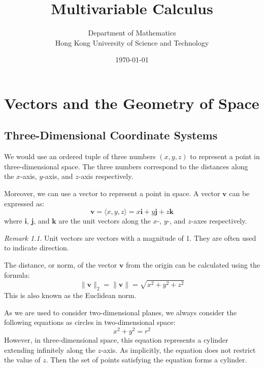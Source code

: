 \documentclass{book}
\theoremstyle{remark}
\newtheorem*{remark}{Remark}
\begin{document}
\frontmatter
\title{\sffamily\Huge\color{ocre} Multivariable Calculus}
\author{\sffamily Department of Mathematics\\\sffamily Hong Kong University of Science and Technology}
\date{\sffamily \today}
\maketitle

\tableofcontents

\mainmatter

\chapter{Vectors and the Geometry of Space}

\section{Three-Dimensional Coordinate Systems}

We would use an ordered tuple of three numbers $(x, y, z)$ to represent a point in three-dimensional space. The three numbers correspond to the distances along the $x$-axis, $y$-axis, and $z$-axis respectively.

Moreover, we can use a vector to represent a point in space. A vector $\mathbf{v}$ can be expressed as:
\[
    \mathbf{v} = \langle x, y, z \rangle = x\mathbf{i} + y\mathbf{j} + z\mathbf{k}
\]
where $\mathbf{i}$, $\mathbf{j}$, and $\mathbf{k}$ are the unit vectors along the $x$-, $y$-, and $z$-axes respectively.

\begin{remark}
    Unit vectors are vectors with a magnitude of 1. They are often used to indicate direction.
\end{remark}

The distance, or norm, of the vector $\mathbf{v}$ from the origin can be calculated using the formula:
\[
    \|\mathbf{v}\|_2 = \|\mathbf{v}\| = \sqrt{x^2 + y^2 + z^2}
\]
This is also known as the Euclidean norm.

As we are used to consider two-dimensional planes, we always consider the following equations as circles in two-dimensional space:
\[
    x^2 + y^2 = r^2
\]
However, in three-dimensional space, this equation represents a cylinder extending infinitely along the $z$-axis. As implicitly, the equation does not restrict the value of $z$. Then the set of points satisfying the equation forms a cylinder.
\end{document}
